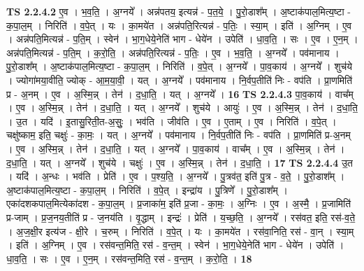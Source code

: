\documentclass[17pt]{extarticle}
\begin{document}
                  \newline
                                \textbf{ TS 2.2.4.2} \newline
                  ए॒व । भ॒व॒ति॒ । अ॒ग्नये᳚ । अन्न॑पतय॒ इत्यन्न॑ - प॒त॒ये॒ । पु॒रो॒डाश᳚म् । अ॒ष्टाक॑पाल॒मित्य॒ष्टा - क॒पा॒ल॒म् । निरिति॑ । व॒पे॒त् । यः । का॒मये॑त । अन्न॑पति॒रित्यन्न॑ - प॒तिः॒ । स्या॒म् । इति॑ । अ॒ग्निम् । ए॒व । अन्न॑पति॒मित्यन्न॑ - प॒ति॒म् । स्वेन॑ । भा॒ग॒धेये॒नेति॑ भाग - धेये॑न । उपेति॑ । धा॒व॒ति॒ । सः । ए॒व । ए॒न॒म् । अन्न॑पति॒मित्यन्न॑ - प॒ति॒म् । क॒रो॒ति॒ । अन्न॑पति॒रित्यन्न॑ - प॒तिः॒ । ए॒व । भ॒व॒ति॒ । अ॒ग्नये᳚ । पव॑मानाय । पु॒रो॒डाश᳚म् । अ॒ष्टाक॑पाल॒मित्य॒ष्टा - क॒पा॒ल॒म् । निरिति॑ । व॒पे॒त् । अ॒ग्नये᳚ । पा॒व॒काय॑ । अ॒ग्नये᳚ । शुच॑ये । ज्योगा॑मया॒वीति॒ ज्योक् - आ॒म॒या॒वी॒ । यत् । अ॒ग्नये᳚ । पव॑मानाय । नि॒र्वप॒तीति॑ निः - वप॑ति । प्रा॒णमिति॑ प्र - अ॒नम् । ए॒व । अ॒स्मि॒न्न् । तेन॑ । द॒धा॒ति॒ । यत् । अ॒ग्नये᳚ । \textbf{  16} \newline
                  \newline
                                \textbf{ TS 2.2.4.3} \newline
                  पा॒व॒काय॑ । वाच᳚म् । ए॒व । अ॒स्मि॒न्न् । तेन॑ । द॒धा॒ति॒ । यत् । अ॒ग्नये᳚ । शुच॑ये । आयुः॑ । ए॒व । अ॒स्मि॒न्न् । तेन॑ । द॒धा॒ति॒ । उ॒त । यदि॑ । इ॒तासु॒रिती॒त-अ॒सुः॒ । भव॑ति । जीव॑ति । ए॒व । ए॒ताम् । ए॒व । निरिति॑ । व॒पे॒त् । चक्षु॑ष्काम॒ इति॒ चक्षुः॑ - का॒मः॒ । यत् । अ॒ग्नये᳚ । पव॑मानाय । नि॒र्वप॒तीति॑ निः - वप॑ति । प्रा॒णमिति॑ प्र-अ॒नम् । ए॒व । अ॒स्मि॒न्न् । तेन॑ । द॒धा॒ति॒ । यत् । अ॒ग्नये᳚ । पा॒व॒काय॑ । वाच᳚म् । ए॒व । अ॒स्मि॒न्न् । तेन॑ । द॒धा॒ति॒ । यत् । अ॒ग्नये᳚ । शुच॑ये । चक्षुः॑ । ए॒व । अ॒स्मि॒न्न् । तेन॑ । द॒धा॒ति॒ । \textbf{  17} \newline
                  \newline
                                \textbf{ TS 2.2.4.4} \newline
                  उ॒त । यदि॑ । अ॒न्धः । भव॑ति । प्रेति॑ । ए॒व । प॒श्य॒ति॒ । अ॒ग्नये᳚ । पु॒त्रव॑त॒ इति॑ पु॒त्र - व॒ते॒ । पु॒रो॒डाश᳚म् । अ॒ष्टाक॑पाल॒मित्य॒ष्टा - क॒पा॒ल॒म् । निरिति॑ । व॒पे॒त् । इन्द्रा॑य । पु॒त्रिणे᳚ । पु॒रो॒डाश᳚म् । एका॑दशकपाल॒मित्येका॑दश - क॒पा॒ल॒म् । प्र॒जाका॑म॒ इति॑ प्र॒जा - का॒मः॒ । अ॒ग्निः । ए॒व । अ॒स्मै॒ । प्र॒जामिति॑ प्र-जाम् । प्र॒ज॒नय॒तीति॑ प्र - ज॒नय॑ति । वृ॒द्धाम् । इन्द्रः॑ । प्रेति॑ । य॒च्छ॒ति॒ । अ॒ग्नये᳚ । रस॑वत॒ इति॒ रस॑-व॒ते॒ । अ॒ज॒क्षी॒र इत्य॑ज - क्षी॒रे । च॒रुम् । निरिति॑ । व॒पे॒त् । यः । का॒मये॑त । रस॑वा॒निति॒ रस॑ - वा॒न् । स्या॒म् । इति॑ । अ॒ग्निम् । ए॒व । रस॑वन्त॒मिति॒ रस॑ - व॒न्त॒म् । स्वेन॑ । भा॒ग॒धेये॒नेति॑ भाग - धेये॑न । उपेति॑ । धा॒व॒ति॒ । सः । ए॒व । ए॒न॒म् । रस॑वन्त॒मिति॒ रस॑ - व॒न्त॒म् । क॒रो॒ति॒ । \textbf{  18} \newline
\end{document}
